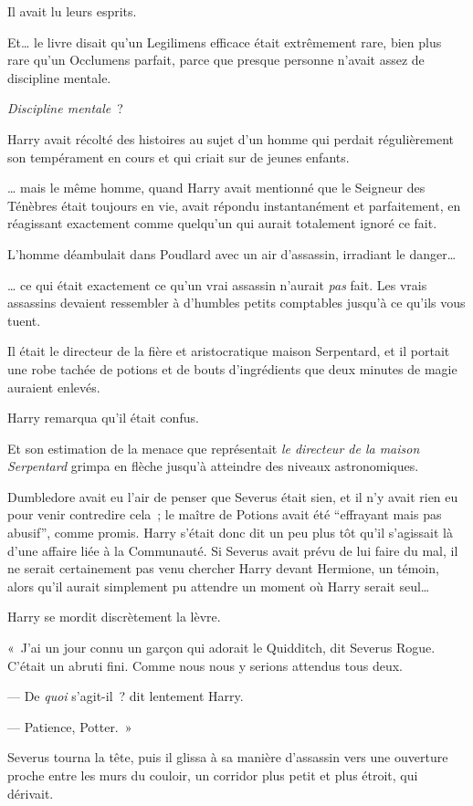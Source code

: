 Il avait lu leurs esprits.

Et… le livre disait qu'un Legilimens efficace était extrêmement rare, bien plus rare qu'un Occlumens parfait, parce que presque personne n'avait assez de discipline mentale.

\emph{Discipline mentale}~?

Harry avait récolté des histoires au sujet d'un homme qui perdait régulièrement son tempérament en cours et qui criait sur de jeunes enfants.

… mais le même homme, quand Harry avait mentionné que le Seigneur des Ténèbres était toujours en vie, avait répondu instantanément et parfaitement, en réagissant exactement comme quelqu'un qui aurait totalement ignoré ce fait.

L'homme déambulait dans Poudlard avec un air d'assassin, irradiant le danger…

… ce qui était exactement ce qu'un vrai assassin n'aurait \emph{pas} fait.
Les vrais assassins devaient ressembler à d'humbles petits comptables jusqu'à ce qu'ils vous tuent.

Il était le directeur de la fière et aristocratique maison Serpentard, et il portait une robe tachée de potions et de bouts d'ingrédients que deux minutes de magie auraient enlevés.

Harry remarqua qu'il était confus.

Et son estimation de la menace que représentait \emph{le directeur de la maison Serpentard} grimpa en flèche jusqu'à atteindre des niveaux astronomiques.

Dumbledore avait eu l'air de penser que Severus était sien, et il n'y avait rien eu pour venir contredire cela~; le maître de Potions avait été “effrayant mais pas abusif”, comme promis.
Harry s'était donc dit un peu plus tôt qu'il s'agissait là d'une affaire liée à la Communauté.
Si Severus avait prévu de lui faire du mal, il ne serait certainement pas venu chercher Harry devant Hermione, un témoin, alors qu'il aurait simplement pu attendre un moment où Harry serait seul…

Harry se mordit discrètement la lèvre.

«~J'ai un jour connu un garçon qui adorait le Quidditch, dit Severus Rogue.
C'était un abruti fini.
Comme nous nous y serions attendus tous deux.

--- De \emph{quoi} s'agit-il~? dit lentement Harry.

--- Patience, Potter.~»

Severus tourna la tête, puis il glissa à sa manière d'assassin vers une ouverture proche entre les murs du couloir, un corridor plus petit et plus étroit, qui dérivait.

